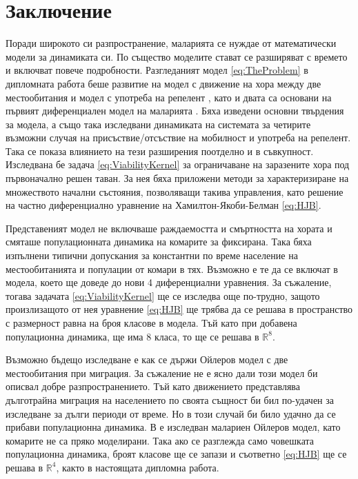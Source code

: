 \section{\hspace{1em} Заключение}
Поради широкото си разпространение, маларията се нуждае от математически модели за динамиката си.
По същество моделите стават се разширяват с времето и включват повече подробности.
Разгледаният модел \eqref{eq:TheProblem} в дипломната работа беше развитие на модел с движение на хора между две местообитания \cite{Bichara2016} и модел с употреба на репелент \cite{Rashkov2022}, като и двата са основани на първият диференциален модел на маларията \cite{Smith2012}.
Бяха изведени основни твърдения за модела, а също така изследвани динамиката на системата за четирите възможни случая на присъствие/отсъствие на мобилност и употреба на репелент.
Така се показа влиянието на тези разширения поотделно и в съвкупност.
Изследвана бе задача \eqref{eq:ViabilityKernel} за ограничаване на заразените хора под първоначално решен таван.
За нея бяха приложени методи \cite{Zidani2013} за характеризиране на множеството начални състояния, позволяващи такива управления, като решение на частно диференциално уравнение на Хамилтон-Якоби-Белман \eqref{eq:HJB}.

Представеният модел не включваше раждаемостта и смъртността на хората и смяташе популационната динамика на комарите за фиксирана.
Така бяха изпълнени типични допускания за константни по време население на местообитанията и популации от комари в тях.
Възможно е те да се включат в модела, което ще доведе до нови 4 диференциални уравнения.
За съжаление, тогава задачата \eqref{eq:ViabilityKernel} ще се изследва още по-трудно, защото произлизащото от нея уравнение \eqref{eq:HJB} ще трябва да се решава в пространство с размерност равна на броя класове в модела.
Тъй като при добавена популационна динамика, ще има 8 класа, то ще се решава в $\mathbb{R}^8$.

Възможно бъдещо изследване е как се държи Ойлеров модел с две местообитания при миграция.
За съжаление не е ясно дали този модел би описвал добре разпространението.
Тъй като движението представлява дълготрайна миграция на населението по своята същност би бил по-удачен за изследване за дълги периоди от време.
Но в този случай би било удачно да се прибави популационна динамика.
В \cite{Prosper2012} е изследван малариен Ойлеров модел, като комарите не са пряко моделирани.
Така ако се разглежда само човешката популационна динамика, броят класове ще се запази и съответно \eqref{eq:HJB} ще се решава в $\mathbb{R}^4$, както в настоящата дипломна работа.

